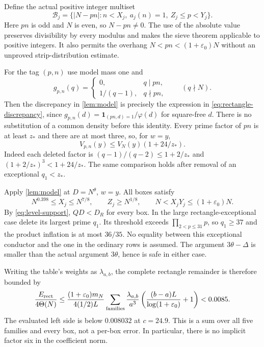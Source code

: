 \documentclass[11pt]{article}
\theoremstyle{definition}
\newcommand{\B}{\mathcal B}
\newcommand{\ind}{\mathbf 1}
\newcommand{\eps}{\varepsilon}
\newcommand{\Th}{\Theta(N)}
\begin{document}
Define the actual positive integer multiset
\[
 \B_j=\{|N-pn|:n<X_j,\ a_j(n)=1,\ Z_j\le p<Y_j\}.
\]
Here $pn$ is odd and $N$ is even, so $N-pn\ne0$.
The use of the absolute value preserves divisibility by every modulus
and makes the sieve theorem applicable to positive integers.
It also permits the overhang $N<pn<(1+\eps_0)N$ without an unproved
strip-distribution estimate.

For the tag $(p,n)$ use model mass one and
\[
 g_{p,n}(q)=
 \begin{cases}0,&q\mid pn,\\1/(q-1),&q\nmid pn,\end{cases}
 \qquad(q\nmid N).
\]
Then the discrepancy in \cref{lem:model} is precisely the expression
in \eqref{eq:rectangle-discrepancy}, since
$g_{p,n}(d)=\ind_{(pn,d)=1}/\varphi(d)$ for square-free $d$.
There is no substitution of a common density before this identity.
Every prime factor of $pn$ is at least $z_*$ and there are at most three,
so, for $w=y$,
\begin{equation}\label{eq:box-tag-product}
 V_{p,n}(y)\le V_N(y)(1+24/z_*).
\end{equation}
Indeed each deleted factor is $(q-1)/(q-2)\le1+2/z_*$ and
$(1+2/z_*)^3<1+24/z_*$.  The same comparison holds after removal of an
exceptional $q_1<z_*$.

Apply \cref{lem:model} at $D=N^\theta$, $w=y$.
All boxes satisfy
\[
 N^{0.398}\le X_j\le N^{7/8},\qquad Z_j\ge N^{1/8},\qquad
 N< X_jY_j\le(1+\eps_0)N.
\]
By \eqref{eq:level-support}, $QD<D_R$ for every box.
In the large rectangle-exceptional case delete its largest prime $q_1$.
Its threshold exceeds $\prod_{2<p\le31}p$, so $q_1\ge37$ and the
product inflation is at most $36/35$.  No equality between this exceptional conductor and the
one in the ordinary rows is assumed.  The argument $3\theta-\Delta$
is smaller than the actual argument $3\theta$, hence is safe in either
case.

Writing the table's weights as $\lambda_{a,b}$, the complete rectangle
remainder is therefore bounded by
\begin{equation}\label{eq:box-error}
 \frac{E_{\rm rect}}{4\Th}
 \le\frac{(1+\eps_0)m_N}{4(1/2)L}
 \sum_{\rm families}\frac{\lambda_{a,b}}{a^3}
 \left(\frac{(b-a)L}{\log(1+\eps_0)}+1\right)
 <0.0085.
\end{equation}
The evaluated left side is below $0.008032$ at $c=24.9$.
This is a sum over all five families and every box, not a per-box error.
In particular, there is no implicit factor six in the coefficient norm.
\end{document}
